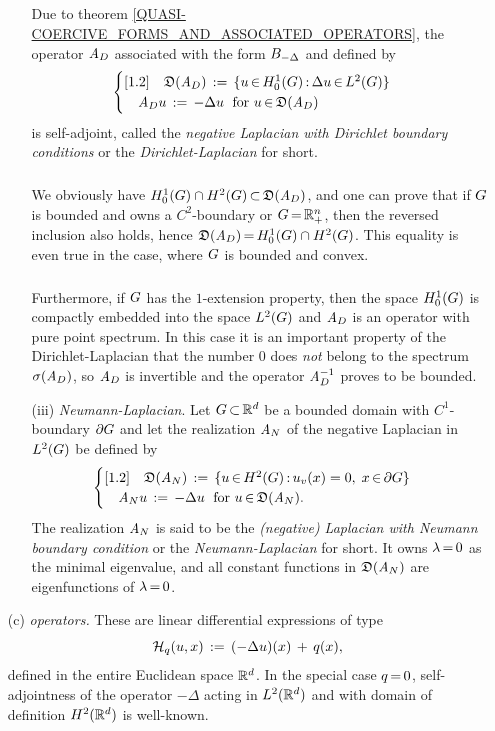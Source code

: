 \documentclass[11pt,twoside]{article}
\begin{document}
\begin{itemize}[leftmargin=17pt]
\begin{itemize}[leftmargin=5mm]
\subparagraph{}
Due to theorem \ref{QUASI-COERCIVE_FORMS_AND_ASSOCIATED_OPERATORS},
the operator $\linA_D$ associated with the form $\DF_{-\Delta}$
and defined by
\[
\begin{cases}[1.2]
\quad \domain{\linA_D} \eqdef
\{u \xeof \HN{1}{\G} \: \Delta u \xeof L^2(\G)\} \\
\quad \linA_D u \eqdef - \Delta u \; \for u \xeof \domain{\linA_D} \\
\end{cases}
\] 
is self-adjoint,
called the \textit{negative Laplacian with Dirichlet boundary conditions}
or the \textit{Dirichlet-Laplacian} for short.

\subparagraph{}
We obviously have
$\HN{1}{\G} \cap H^2(\G) \xsubset \domain{\linA_D}$,
and one can prove that
if $\G$ is bounded and owns a $C^2$-boundary or $\G \eq \R_+^n$,
then the reversed inclusion also holds,
hence $\domain{\linA_D} \eq \HN{1}{\G} \cap H^2(\G)$.
This equality is even true in the case,
where $\G$ is bounded and convex.

\subparagraph{}
Furthermore,
if $\G$ has the $1$-extension property,
then the space $\HN{1}{\G}$ is compactly embedded into the space $\Lh$
and $\linA_D$ is an operator with pure point spectrum.
In this case it is an important property of the Dirichlet-Laplacian
that the number $0$ does \textit{not} belong to the spectrum $\sigma(\linA_D)$,
so $\linA_D$ is invertible and the operator $\linA_D^{-1}$ proves to be bounded.

\item[(iii)]
\textit{Neumann-Laplacian}.
Let $\G \xsubset \Rd$ be a bounded domain with $C^1$-boundary $\partial \G$
and let the realization $\linA_N$ of the negative Laplacian in $\Lh$
be defined by
\[
\begin{cases}[1.2]
\quad \domain{\linA_N} \eqdef
\{ u \xeof H^2(\G) \: u_v(x)= 0, \; x \xeof \partial \G \} \\
\quad \linA_N u \eqdef - \Delta u \; \for u \xeof \domain{\linA_N}. \\
\end{cases}
\]
The realization $\linA_N$ is said to be the
\textit{(negative) Laplacian with Neumann boundary condition}
or the \textit{Neumann-Laplacian} for short.
It owns $\lambda \eq 0$ as the minimal eigen\-value,
and all constant functions in $\domain{\linA_N}$ are eigen\-functions
of $\lambda \eq 0$.
\end{itemize}

\item[(c)] \textit{{\SCHROEDINGER} operators.}
These are linear differential expressions of type
\[
{\mathcal{H}}_q(u,x) \,:=\, (-\Delta u)(x) \,+\, q(x),
\]
defined in the entire Euclidean space ${\mathbb{R}}^d$.
In the special case $q {\,=\,} 0$,
self-adjointness of the operator $-\Delta$ acting in $L^2({\mathbb{R}}^d)$
and with domain of definition $H^2({\mathbb{R}}^d)$ is well-known.


\end{itemize}
\end{document}
